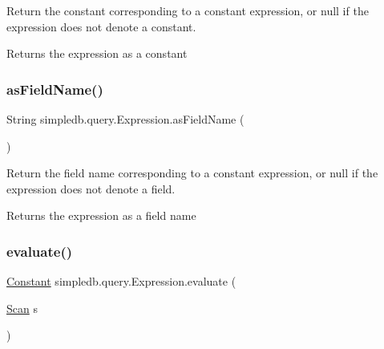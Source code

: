 Return the constant corresponding to a constant expression, or null if the expression does not denote a constant. \begin{DoxyReturn}{Returns}
the expression as a constant 
\end{DoxyReturn}
\mbox{\label{classsimpledb_1_1query_1_1Expression_ae4d3c3da3385d0ee2f5a741e46625403}} 
\subsubsection{\texorpdfstring{as\+Field\+Name()}{asFieldName()}}
{\footnotesize\ttfamily String simpledb.\+query.\+Expression.\+as\+Field\+Name (\begin{DoxyParamCaption}{ }\end{DoxyParamCaption})\hspace{0.3cm}{\ttfamily [inline]}}

Return the field name corresponding to a constant expression, or null if the expression does not denote a field. \begin{DoxyReturn}{Returns}
the expression as a field name 
\end{DoxyReturn}
\mbox{\label{classsimpledb_1_1query_1_1Expression_a09021c7fb93aa5530f6b5ddccde46a2c}} 
\subsubsection{\texorpdfstring{evaluate()}{evaluate()}}
{\footnotesize\ttfamily \hyperlink{classsimpledb_1_1query_1_1Constant}{Constant} simpledb.\+query.\+Expression.\+evaluate (\begin{DoxyParamCaption}\item[{\hyperlink{interfacesimpledb_1_1query_1_1Scan}{Scan}}]{s }\end{DoxyParamCaption})\hspace{0.3cm}{\ttfamily [inline]}}

